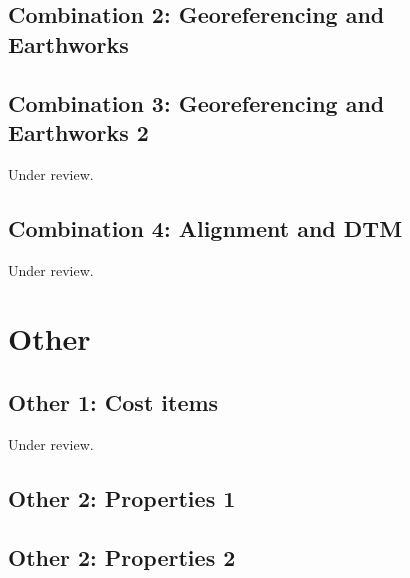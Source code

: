 \documentclass{scrartcl}
\begin{document}
\subsection{Combination 2: Georeferencing and Earthworks}
\label{sec:georef_earth_1}
\clearpage

\subsection{Combination 3: Georeferencing and Earthworks 2} %
\label{sec:georef_earth_2}
Under review.%
\clearpage

\subsection{Combination 4: Alignment and DTM}
\label{sec:align_dtm_2}
Under review.%
\clearpage

\section{Other}
\label{sec:other}

\subsection{Other 1: Cost items} %
\label{sec:other_1}
Under review.%
\clearpage

\subsection{Other 2: Properties 1} %
\label{sec:other_2}
\clearpage

\subsection{Other 2: Properties 2} %
\label{sec:other_3}
\clearpage
\end{document}
